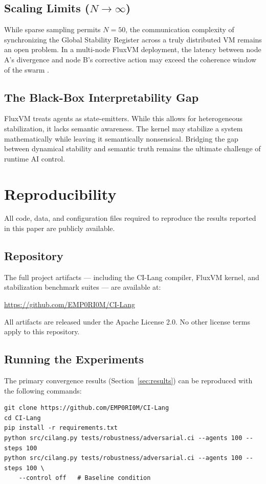 \documentclass{article}
\begin{document}
\subsection{Scaling Limits ($N \to \infty$)}
While sparse sampling permits $N=50$, the communication complexity of synchronizing the Global Stability Register across a truly distributed VM remains an open problem. In a multi-node FluxVM deployment, the latency between node A's divergence and node B's corrective action may exceed the coherence window of the swarm \cite{lynch1996distributed}.

\subsection{The Black-Box Interpretability Gap}
FluxVM treats agents as state-emitters. While this allows for heterogeneous stabilization, it lacks semantic awareness. The kernel may stabilize a system mathematically while leaving it semantically nonsensical. Bridging the gap between dynamical stability and semantic truth remains the ultimate challenge of runtime AI control.

\newpage

\section{Reproducibility}
\label{sec:reproducibility}

All code, data, and configuration files required to reproduce the results reported in this paper are publicly available.

\subsection{Repository}
The full project artifacts — including the CI-Lang compiler, FluxVM kernel, and stabilization benchmark suites — are available at:
\begin{center}
    \url{https://github.com/EMP0RI0M/CI-Lang}
\end{center}
All artifacts are released under the Apache License 2.0. No other license terms apply to this repository.

\subsection{Running the Experiments}
The primary convergence results (Section~\ref{sec:results}) can be reproduced with the following commands:
\begin{verbatim}
git clone https://github.com/EMP0RI0M/CI-Lang
cd CI-Lang
pip install -r requirements.txt
python src/cilang.py tests/robustness/adversarial.ci --agents 100 --steps 100
python src/cilang.py tests/robustness/adversarial.ci --agents 100 --steps 100 \
    --control off   # Baseline condition
\end{verbatim}
\end{document}
